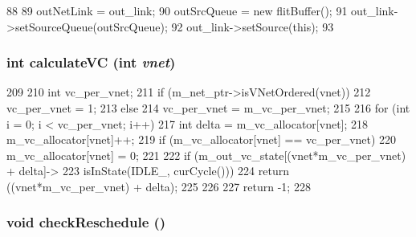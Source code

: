 \begin{DoxyCode}
88 {
89     outNetLink = out_link;
90     outSrcQueue = new flitBuffer();
91     out_link->setSourceQueue(outSrcQueue);
92     out_link->setSource(this);
93 }
\end{DoxyCode}
\hypertarget{classNetworkInterface_ab27658cc3136de94d2d08c78ac499aff}{
\subsubsection[{calculateVC}]{\setlength{\rightskip}{0pt plus 5cm}int calculateVC (int {\em vnet})}}
\label{classNetworkInterface_ab27658cc3136de94d2d08c78ac499aff}



\begin{DoxyCode}
209 {
210     int vc_per_vnet;
211     if (m_net_ptr->isVNetOrdered(vnet))
212         vc_per_vnet = 1;
213     else
214         vc_per_vnet = m_vc_per_vnet;
215 
216     for (int i = 0; i < vc_per_vnet; i++) {
217         int delta = m_vc_allocator[vnet];
218         m_vc_allocator[vnet]++;
219         if (m_vc_allocator[vnet] == vc_per_vnet)
220             m_vc_allocator[vnet] = 0;
221 
222         if (m_out_vc_state[(vnet*m_vc_per_vnet) + delta]->
223                 isInState(IDLE_, curCycle())) {
224             return ((vnet*m_vc_per_vnet) + delta);
225         }
226     }
227     return -1;
228 }
\end{DoxyCode}
\hypertarget{classNetworkInterface_af954e8e2150e2ce2e1b87081bbd9c678}{
\subsubsection[{checkReschedule}]{\setlength{\rightskip}{0pt plus 5cm}void checkReschedule ()}}
\label{classNetworkInterface_af954e8e2150e2ce2e1b87081bbd9c678}



